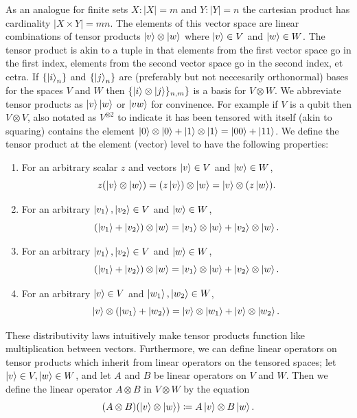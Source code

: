\documentclass[12pt,twoside]{reedthesis}
\theoremstyle{plain}   %
\theoremstyle{definition}
\theoremstyle{remark}
\numberwithin{equation}{section}
\begin{document}
   As an analogue for finite sets $X: |X| = m$ and $Y: |Y| = n$ the cartesian product has cardinality $|X \times Y| = mn$.
   The elements of this vector space are linear combinations of tensor products $\ket{v} \otimes \ket{w}$
   where $\ket{v} \in V$ and $\ket{w} \in W$.
   The tensor product is akin to a tuple in that elements from the first vector space go in the first index, elements from the second vector space go in the second index, et cetra.
   If $\{\ket{i}_n \}$ and $\{\ket{j}_n \}$ are (preferably but not neccesarily orthonormal) bases for the spaces $V$ and $W$ then $\{ \ket{i} \otimes \ket{j} \}_{n, m}\}$ is a basis for $V \otimes W$.
   We abbreviate tensor products as $\ket{v} \ket{w}$ or $\ket{vw}$ for convinence.
   For example if $V$ is a qubit then $V \otimes V$, also notated as $V^{\otimes 2}$ to indicate it has been tensored with itself (akin to squaring) contains the element
   $\ket{0} \otimes \ket{0} + \ket{1} \otimes \ket{1} = \ket{0 0} + \ket{1 1}$.
   We define the tensor product at the element (vector) level to have the following properties:
   \begin{enumerate}
   \item For an arbitrary scalar $z$ and vectors $\ket{v} \in V$ and $\ket{w} \in W$,
     \[ z ( \ket{v} \otimes \ket{w}) = (z \ket{v}) \otimes \ket{w} = \ket{v} \otimes (z \ket{w }).\]

   \item
     For an arbitrary $\ket{v_1}, \ket{v_2} \in V$ and $\ket{w} \in W$,
     \[ (\ket{v_1} + \ket{v_2}) \otimes \ket{w} = \ket{v_1}  \otimes \ket{w} + \ket{v_2} \otimes \ket{w}. \]
   \item
     For an arbitrary $\ket{v_1}, \ket{v_2} \in V$ and $\ket{w} \in W$,
     \[ (\ket{v_1} + \ket{v_2}) \otimes \ket{w} = \ket{v_1}  \otimes \ket{w} + \ket{v_2} \otimes \ket{w}. \]
   \item
     For an arbitrary $\ket{v} \in V$ and $\ket{w_1}, \ket{w_2} \in W$,
     \[ \ket{v} \otimes (\ket{w_1} + \ket{w_2})  = \ket{v}  \otimes \ket{w_1} + \ket{v} \otimes \ket{w_2}. \]
   \end{enumerate}
   These distributivity laws intuitively make tensor products function like multiplication between vectors.
   Furthermore, we can define linear operators on tensor products which inherit from linear operators on the tensored spaces;
   let $\ket{v} \in V, \ket{w} \in W$, and let $A$ and $B$ be linear operators on $V$ and $W$.
   Then we define the linear operator $A \otimes B$ in $V \otimes W$ by the equation
   \[(A \otimes B) (\ket{v} \otimes \ket{w}) \coloneq A  \ket{v} \otimes B \ket{w}.\]
\end{document}
